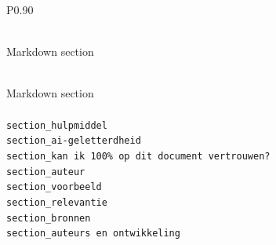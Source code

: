 \begingroup
\small
\setlength{\tabcolsep}{4pt}
\renewcommand{\arraystretch}{1.1}
\setlength{\LTcapwidth}{\textwidth}
\setlength{\LTleft}{0pt plus 1fill}
\setlength{\LTright}{0pt plus 1fill}
\begin{longtable}{P{0.90\textwidth}}
\caption{Markdown sections identified in Algoritmekader hulpmiddelen files.} \label{tab:algoritmekader-hulpmiddelen-section-fields} \\
\toprule
Markdown section \\
\midrule
\endfirsthead
\caption[]{Markdown sections identified in Algoritmekader hulpmiddelen files.} \\
\toprule
Markdown section \\
\midrule
\endhead
\midrule
{} \\
\midrule
\endfoot
\bottomrule
\endlastfoot
\texttt{section\_\allowbreak{}hulpmiddel} \\
\texttt{section\_\allowbreak{}ai-\allowbreak{}geletterdheid} \\
\texttt{section\_\allowbreak{}kan ik 100\% op dit document vertrouwen?} \\
\texttt{section\_\allowbreak{}auteur} \\
\texttt{section\_\allowbreak{}voorbeeld} \\
\texttt{section\_\allowbreak{}relevantie} \\
\texttt{section\_\allowbreak{}bronnen} \\
\texttt{section\_\allowbreak{}auteurs en ontwikkeling} \\
\end{longtable}
\endgroup
